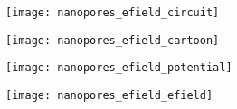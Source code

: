 %
\begin{figure*}[t]
  \centering

  \begin{subfigure}[t]{15mm}
    \centering
    \caption{}\vspace{-2.5mm}\label{fig:nanopores_efield_circuit}
    \texttt{[image: nanopores\_efield\_circuit]}
  \end{subfigure}
  \hspace{-3mm}
  \begin{subfigure}[t]{25mm}
    \centering
    \caption{}\vspace{-2.5mm}\label{fig:nanopores_efield_cartoon}
    \texttt{[image: nanopores\_efield\_cartoon]}
  \end{subfigure}
  \hspace{-2.5mm}
  \begin{subfigure}[t]{35mm}
    \centering
    \caption{}\vspace{-2.5mm}\label{fig:nanopores_efield_potential}
    \texttt{[image: nanopores\_efield\_potential]}
  \end{subfigure}
  \hspace{-0.5mm}
  \begin{subfigure}[t]{35mm}
    \centering
    \caption{}\vspace{-2.5mm}\label{fig:nanopores_efield_efield}
    \texttt{[image: nanopores\_efield\_efield]}
  \end{subfigure}


\end{figure*}
